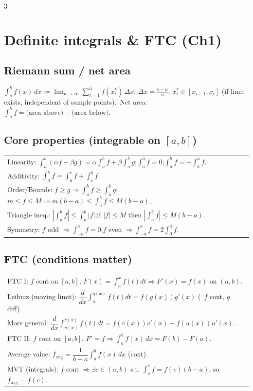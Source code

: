 \documentclass[10pt]{article}
\newcommand{\dx}{\,dx}
\begin{document}
\begin{multicols}{3}
\footnotesize
\raggedcolumns

\section*{Definite integrals \& FTC (Ch1)}
\subsection*{Riemann sum / net area}
$\displaystyle \int_a^b f(x)\dx:=\lim_{n\to\infty}\sum_{i=1}^n f(x_i^*)\,\Delta x$, $\Delta x=\frac{b-a}{n}$, $x_i^*\in[x_{i-1},x_i]$ (if limit exists, independent of sample points).\
Net area: $\int_a^b f=\text{(area above)}-\text{(area below)}$.

\subsection*{Core properties (integrable on $[a,b]$)}
\vspace{-1pt}
\begin{tabular}{@{}p{}@{}}
Linearity: $\int_a^b(\alpha f+\beta g)=\alpha\int_a^b f+\beta\int_a^b g$;\quad $\int_a^a f=0$;\quad $\int_a^b f=-\int_b^a f$.\\
Additivity: $\int_a^b f=\int_a^c f+\int_c^b f$.\\
Order/Bounds: $f\ge g\Rightarrow \int_a^b f\ge\int_a^b g$;\quad $m\le f\le M\Rightarrow m(b-a)\le\int_a^b f\le M(b-a)$.\\
Triangle ineq.: $\left|\int_a^b f\right|\le\int_a^b |f|$;\quad if $|f|\le M$ then $\left|\int_a^b f\right|\le M(b-a)$.\\
Symmetry: $f$ odd $\Rightarrow\int_{-a}^a f=0$;\quad $f$ even $\Rightarrow\int_{-a}^a f=2\int_0^a f$.\\
\end{tabular}

\subsection*{FTC (conditions matter)}
\vspace{-1pt}
\begin{tabular}{@{}p{}@{}}
FTC I: $f$ cont on $[a,b]$, $F(x)=\int_a^x f(t)dt\Rightarrow F'(x)=f(x)$ on $(a,b)$.\\
Leibniz (moving limit): $\dfrac{d}{dx}\int_{a}^{g(x)} f(t)dt=f(g(x))g'(x)$ (\ $f$ cont, $g$ diff).\\
More general: $\dfrac{d}{dx}\int_{u(x)}^{v(x)} f(t)dt=f(v(x))v'(x)-f(u(x))u'(x)$.\\
FTC II: $f$ cont on $[a,b]$, $F'=f\Rightarrow\int_a^b f(x)\dx=F(b)-F(a)$.\\
Average value: $f_{\text{avg}}=\dfrac{1}{b-a}\int_a^b f(x)\dx$ (cont).\\
MVT (integrals): $f$ cont $\Rightarrow\exists c\in(a,b)$ s.t. $\int_a^b f=f(c)(b-a)$, so $f_{\text{avg}}=f(c)$.\\
\end{tabular}


\end{multicols}
\end{document}
